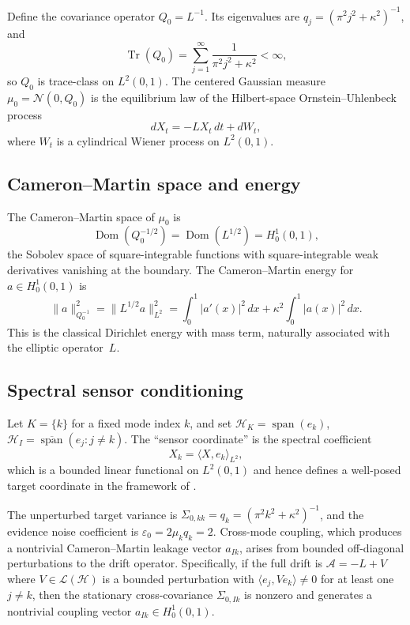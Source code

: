 \documentclass[11pt]{amsart}
\theoremstyle{plain}
\theoremstyle{definition}
\theoremstyle{remark}
\newcommand{\tr}{\operatorname{Tr}}
\begin{document}
    Define the covariance operator $Q_0 = L^{-1}$. Its eigenvalues are $q_j = (\pi^2 j^2 + \kappa^2)^{-1}$, and
    \[
    \tr(Q_0) = \sum_{j=1}^\infty \frac{1}{\pi^2 j^2 + \kappa^2} < \infty,
    \]
    so $Q_0$ is trace-class on $L^2(0,1)$. The centered Gaussian measure $\mu_0 = \mathcal{N}(0, Q_0)$ is the equilibrium law of the Hilbert-space Ornstein--Uhlenbeck process
    \[
    dX_t = -LX_t\,dt + dW_t,
    \]
    where $W_t$ is a cylindrical Wiener process on $L^2(0,1)$.

    \subsection{Cameron--Martin space and energy}
    \label{sec:spde:cm}

    The Cameron--Martin space of $\mu_0$ is
    \[
    \operatorname{Dom}(Q_0^{-1/2}) = \operatorname{Dom}(L^{1/2}) = H_0^1(0,1),
    \]
    the Sobolev space of square-integrable functions with square-integrable weak derivatives vanishing at the boundary. The Cameron--Martin energy for $a \in H_0^1(0,1)$ is
    \begin{equation}
        \label{eq:cm_energy_dirichlet}
        \|a\|_{Q_0^{-1}}^2
        = \|L^{1/2} a\|_{L^2}^2
        = \int_0^1 |a'(x)|^2\,dx + \kappa^2 \int_0^1 |a(x)|^2\,dx.
    \end{equation}
    This is the classical Dirichlet energy with mass term, naturally associated with the elliptic operator~$L$.

    \subsection{Spectral sensor conditioning}
    \label{sec:spde:conditioning}

    Let $K = \{k\}$ for a fixed mode index $k$, and set $\mathcal{H}_K = \operatorname{span}(e_k)$, $\mathcal{H}_I = \overline{\operatorname{span}}(e_j : j \neq k)$. The ``sensor coordinate'' is the spectral coefficient
    \[
    X_k = \langle X, e_k \rangle_{L^2},
    \]
    which is a bounded linear functional on $L^2(0,1)$ and hence defines a well-posed target coordinate in the framework of .

    The unperturbed target variance is $\Sigma_{0,kk} = q_k = (\pi^2 k^2 + \kappa^2)^{-1}$, and the evidence noise coefficient is $\varepsilon_0 = 2\mu_k q_k = 2$. Cross-mode coupling, which produces a nontrivial Cameron--Martin leakage vector $a_{Ik}$, arises from bounded off-diagonal perturbations to the drift operator. Specifically, if the full drift is $\mathcal{A} = -L + V$ where $V \in \mathcal{L}(\mathcal{H})$ is a bounded perturbation with $\langle e_j, V e_k \rangle \neq 0$ for at least one $j \neq k$, then the stationary cross-covariance $\Sigma_{0,Ik}$ is nonzero and generates a nontrivial coupling vector $a_{Ik} \in H_0^1(0,1)$.
\end{document}
